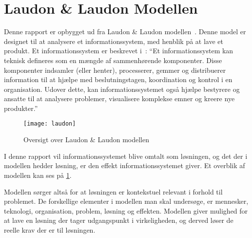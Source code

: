 \section{Laudon \& Laudon Modellen}
Denne rapport er opbygget ud fra Laudon \& Laudon modellen~\cite{laudon}. Denne model er designet til at analysere et informationssystem, med henblik på at lave et produkt. Et informationssystem er beskrevet i~\cite{laudon2006management}: \enquote{Et informationssystem kan teknisk defineres som en mængde af sammenhørende komponenter. Disse komponenter indsamler (eller henter), processerer, gemmer og distribuerer information til at hjælpe med beslutningstagen, koordination og kontrol i en organisation. Udover dette, kan informationssystemet også hjælpe bestyrere og ansatte til at analysere problemer, visualisere komplekse emner og kreere nye produkter.}

\begin{figure}
  \centering
  \texttt{[image: laudon]}
	\caption{Oversigt over Laudon \& Laudon modellen}
	\label{fig:oversigt_laudon}
\end{figure}

I denne rapport vil informationssystemet blive omtalt som løsningen, og det der i modellen hedder løsning, er den effekt informationssystemet giver. Et overblik af modellen kan ses på \cref{fig:oversigt_laudon}. 

Modellen sørger altså for at løsningen er kontekstuel relevant i forhold til problemet. De forskellige elementer i modellen man skal undersøge, er mennesker, teknologi, organisation, problem, løsning og effekten. Modellen giver mulighed for at lave en løsning der tager udgangspunkt i virkeligheden, og derved løser de reelle krav der er til løsningen.
